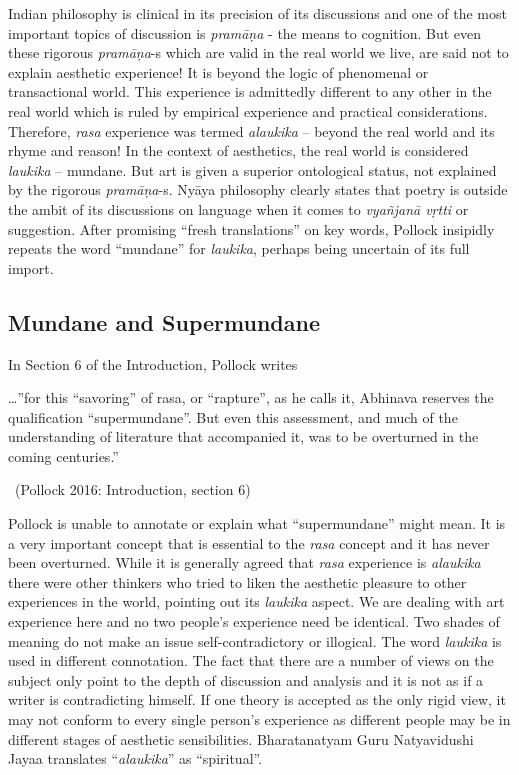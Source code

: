 Indian philosophy is clinical in its precision of its discussions and one of the most important topics of discussion is \textit{pramāṇa} - the means to cognition. But even these rigorous \textit{pramāṇa}-s which are valid in the real world we live, are said not to explain aesthetic experience! It is beyond the logic of phenomenal or transactional world. This experience is admittedly different to any other in the real world which is ruled by empirical experience and practical considerations. Therefore, \textit{rasa} experience was termed \textit{alaukika} – beyond the real world and its rhyme and reason! In the context of aesthetics, the real world is considered \textit{laukika} – mundane. But art is given a superior ontological status, not explained by the rigorous \textit{pramāṇa}-s. Nyāya philosophy clearly states that poetry is outside the ambit of its discussions on language when it comes to \textit{vyañjanā vṛtti} or suggestion. After promising “fresh translations” on key words, Pollock insipidly repeats the word “mundane” for \textit{laukika}, perhaps being uncertain of its full import.


\subsection*{Mundane and Supermundane}

In Section 6 of the Introduction, Pollock writes

\begin{myquote}
…”for this “savoring” of rasa, or “rapture”, as he calls it, Abhinava reserves the qualification “supermundane”. But even this assessment, and much of the understanding of literature that accompanied it, was to be overturned in the coming centuries.” 

~\hfill (Pollock 2016: Introduction, section 6)
\end{myquote}

Pollock is unable to annotate or explain what “supermundane” might mean. It is a very important concept that is essential to the \textit{rasa} concept and it has never been overturned. While it is generally agreed that \textit{rasa} experience is \textit{alaukika} there were other thinkers who tried to liken the aesthetic pleasure to other experiences in the world, pointing out its \textit{laukika} aspect. We are dealing with art experience here and no two people’s experience need be identical. Two shades of meaning do not make an issue self-contradictory or illogical. The word \textit{laukika} is used in different connotation. The fact that there are a number of views on the subject only point to the depth of discussion and analysis and it is not as if a writer is contradicting himself. If one theory is accepted as the only rigid view, it may not conform to every single person’s experience as different people may be in different stages of aesthetic sensibilities. Bharatanatyam Guru Natyavidushi Jayaa translates “\textit{alaukika}” as “spiritual”.

